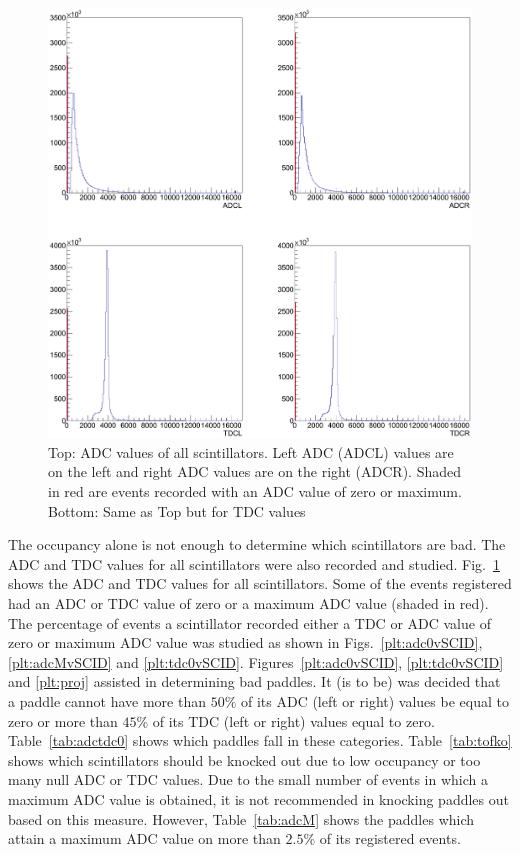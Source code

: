 \begin{figure}\begin{center}
    \includegraphics[width=0.70\linewidth]{figures/calib/tof/tofko/adctdcval.eps}
    \caption{\label{plt:adctdcval}Top: ADC values of all scintillators. Left ADC (ADCL) values are on the left and right ADC values are on the right (ADCR). Shaded in red are events recorded with an ADC value of zero or maximum. Bottom: Same as Top but for TDC values}
\end{center}\end{figure}

The occupancy alone is not enough to determine which scintillators are bad. The ADC and TDC values for all scintillators were also recorded and studied. Fig.~\ref{plt:adctdcval} shows the ADC and TDC values for all scintillators. Some of the events registered had an ADC or TDC value of zero or a maximum ADC value (shaded in red). The percentage of events a scintillator recorded either a TDC or ADC value of zero or maximum ADC value was studied as shown in Figs.~\ref{plt:adc0vSCID}, \ref{plt:adcMvSCID} and \ref{plt:tdc0vSCID}. Figures~\ref{plt:adc0vSCID}, \ref{plt:tdc0vSCID} and \ref{plt:proj} assisted in determining bad paddles. It (is to be) was decided that a paddle cannot have more than $50\%$ of its ADC (left or right) values be equal to zero or more than $45\%$ of its TDC (left or right) values equal to zero. Table~\ref{tab:adctdc0} shows which paddles fall in these categories. Table~\ref{tab:tofko} shows which scintillators should be knocked out due to low occupancy or too many null ADC or TDC values. Due to the small number of events in which a maximum ADC value is obtained, it is not recommended in knocking paddles out based on this measure. However, Table~\ref{tab:adcM} shows the paddles which attain a maximum ADC value on more than $2.5\%$ of its registered events.

